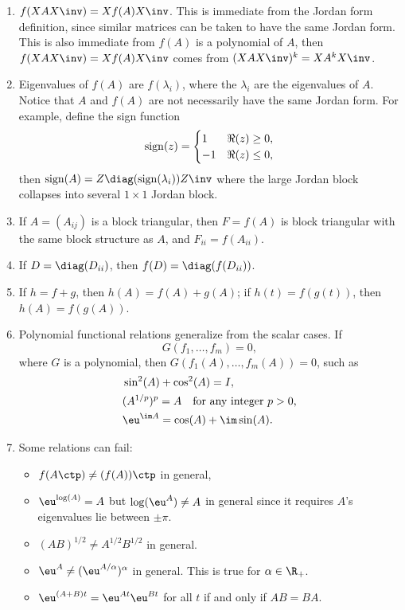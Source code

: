 \documentclass{article}
\newcommand{\subscript}[2]{$#1 _ #2$}
\def\sign{\mathrm{sign}}
\begin{document}
\begin{enumerate}[label=(\subscript{P}{{\arabic*}})]
    \item $f(XAX\inv) = Xf(A)X\inv$. This is immediate from the Jordan
    form definition, since similar matrices can be taken to have the
    same Jordan form. This is also immediate from $f(A)$ is a polynomial
    of $A$, then $f(XAX\inv) = Xf(A)X\inv$ comes from $(XAX\inv)^k =
    XA^kX\inv$.
    \item Eigenvalues of $f(A)$ are $f(\lambda_i)$, where the
    $\lambda_i$ are the eigenvalues of $A$. Notice that $A$ and $f(A)$
    are not necessarily have the same Jordan form. For example, define
    the sign function
    \begin{equation}\notag
        \sign(z) = 
        \begin{cases}
            1 & \Re(z)\geq 0, \\ -1 & \Re(z) \leq 0,
        \end{cases}
    \end{equation}
    then $\sign(A) = Z \diag(\sign(\lambda_i))Z\inv$ where the large
    Jordan block collapses into several $1\times 1$ Jordan block.
    \item If $A = (A_{ij})$ is a block triangular, then $F = f(A)$ is
    block triangular with the same block structure as $A$, and $F_{ii} =
    f(A_{ii})$.
    \item If $D = \diag(D_{ii})$, then $f(D) = \diag(f(D_{ii}))$.
    \item If $h = f+g$, then $h(A) = f(A) + g(A)$; if $h(t) = f(g(t))$,
    then $h(A) = f(g(A))$.
    \item Polynomial functional relations generalize from the scalar
    cases. If $$G(f_1,\dots,f_m) = 0, $$ where $G$ is a polynomial, then
    $G(f_1(A),\dots, f_m(A)) = 0$, such as 
    \begin{equation}\notag
        \begin{aligned}
            & \sin^2(A) + \cos^2(A) = I, \\
            & (A^{1/p})^p = A \quad \text{for any integer $p > 0$,}\\
            & \eu^{\im A} = \cos(A) + \im \sin(A).
        \end{aligned}
    \end{equation}
    \item Some relations can fail:
    \begin{itemize}
        \item $f(A\ctp) \neq (f(A))\ctp$ in general,
        \item $\eu^{\log(A)} = A$ but $\log(\eu^A) \neq A$ in general
        since it requires $A$'s eigenvalues lie between $\pm \pi$.
        \item $(AB)^{1/2} \neq A^{1/2} B^{1/2}$ in general.
        \item $\eu^A \neq (\eu^{A/\alpha})^{\alpha}$ in general. This is
        true for $\alpha \in \R_+$. 
        \item $\eu^{(A+B)t} = \eu^{At}\eu^{Bt}$ for all $t$ if and only
        if $AB = BA$.
    \end{itemize}
\end{enumerate}
\end{document}
